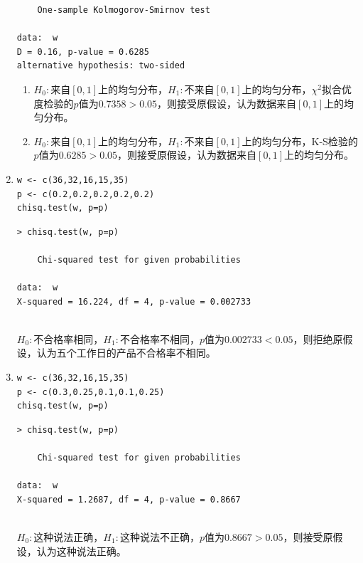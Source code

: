 \begin{enumerate}
\begin{lstlisting}
	One-sample Kolmogorov-Smirnov test

data:  w
D = 0.16, p-value = 0.6285
alternative hypothesis: two-sided
\end{lstlisting}
        \summary
        \begin{enumerate}[label=(\arabic*)]
            \item $H_0:$来自$[0,1]$上的均匀分布，$H_1:$不来自$[0,1]$上的均匀分布，$\chi^2$拟合优度检验的$p$值为$0.7358>0.05$，则接受原假设，认为数据来自$[0,1]$上的均匀分布。
            \item $H_0:$来自$[0,1]$上的均匀分布，$H_1:$不来自$[0,1]$上的均匀分布，K-S检验的$p$值为$0.6285>0.05$，则接受原假设，认为数据来自$[0,1]$上的均匀分布。
        \end{enumerate}
        \item
        \code
\begin{lstlisting}
w <- c(36,32,16,15,35)
p <- c(0.2,0.2,0.2,0.2,0.2)
chisq.test(w, p=p)
\end{lstlisting}
        \out
\begin{lstlisting}
> chisq.test(w, p=p)

	Chi-squared test for given probabilities

data:  w
X-squared = 16.224, df = 4, p-value = 0.002733
\end{lstlisting}
        \summary\\
        $H_0:$不合格率相同，$H_1:$不合格率不相同，$p$值为$0.002733<0.05$，则拒绝原假设，认为五个工作日的产品不合格率不相同。
        \item
        \code
\begin{lstlisting}
w <- c(36,32,16,15,35)
p <- c(0.3,0.25,0.1,0.1,0.25)
chisq.test(w, p=p)
\end{lstlisting}
        \out
\begin{lstlisting}
> chisq.test(w, p=p)

	Chi-squared test for given probabilities

data:  w
X-squared = 1.2687, df = 4, p-value = 0.8667
\end{lstlisting}
        \summary\\
        $H_0:$这种说法正确，$H_1:$这种说法不正确，$p$值为$0.8667>0.05$，则接受原假设，认为这种说法正确。
    \end{enumerate}
\clearpage
